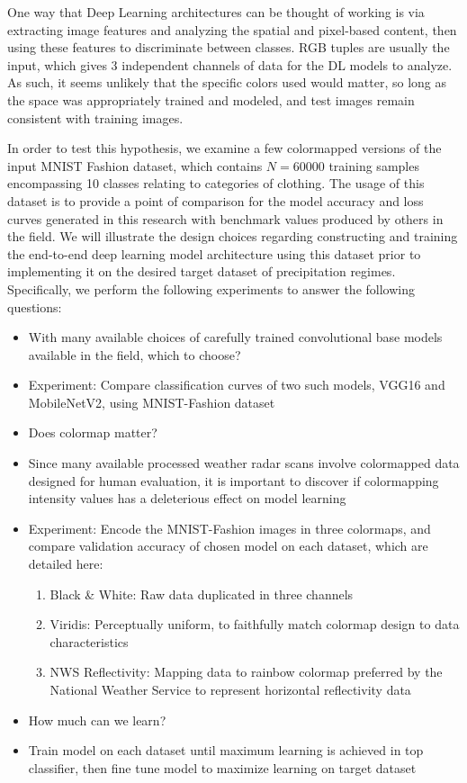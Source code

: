 One way that Deep Learning architectures can be thought of working is via extracting image features and analyzing the spatial and pixel-based content, then using these features to discriminate between classes.
RGB tuples are usually the input, which gives 3 independent channels of data for the DL models to analyze.
As such, it seems unlikely that the specific colors used would matter, so long as the space was appropriately trained and modeled, and test images remain consistent with training images.

In order to test this hypothesis, we examine a few colormapped versions of the input MNIST Fashion dataset, which contains $N=60000$ training samples encompassing 10 classes relating to categories of clothing.
The usage of this dataset is to provide a point of comparison for the model accuracy and loss curves generated in this research with benchmark values produced by others in the field.
We will illustrate the design choices regarding constructing and training the end-to-end deep learning model architecture using this dataset prior to implementing it on the desired target dataset of precipitation regimes.
Specifically, we perform the following experiments to answer the following questions:

\begin{itemize}
	\item With many available choices of carefully trained convolutional base models available in the field, which to choose?
		\item Experiment: Compare classification curves of two such models, VGG16 and MobileNetV2, using MNIST-Fashion dataset
	\item Does colormap matter?
		\item Since many available processed weather radar scans involve colormapped data designed for human evaluation, it is important to discover if colormapping intensity values has a deleterious effect on model learning
		\item Experiment: Encode the MNIST-Fashion images in three colormaps, and compare validation accuracy of chosen model on each dataset, which are detailed here:
		\begin{enumerate}
			\item Black \& White: Raw data duplicated in three channels
			\item Viridis: Perceptually uniform, to faithfully match colormap design to data characteristics
			\item NWS Reflectivity: Mapping data to rainbow colormap preferred by the National Weather Service to represent horizontal reflectivity data
		\end{enumerate}
	\item How much can we learn?
		\item Train model on each dataset until maximum learning is achieved in top classifier, then fine tune model to maximize learning on target dataset
\end{itemize}

